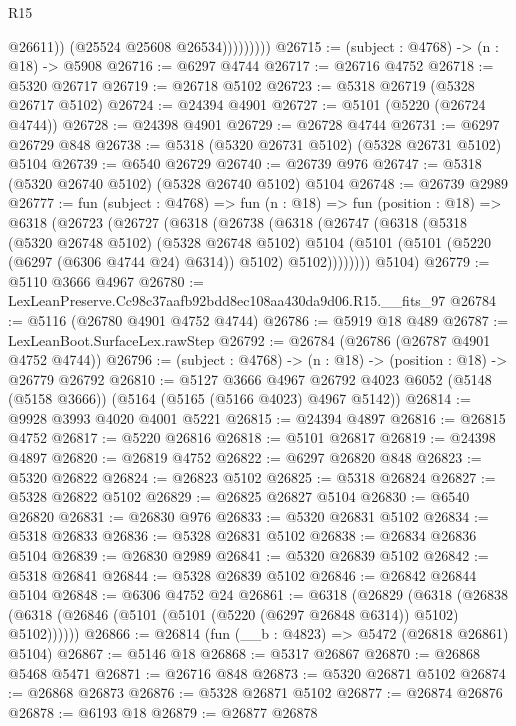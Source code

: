 \begin{lexlean}{R15}
\begin{coremodule}
{{{{{{{{{{{                        @26611))
                    (@25524 @25608 @26534)))))))))
@26715 := (subject : @4768) -> (n : @18) -> @5908
@26716 := @6297 @4744
@26717 := @26716 @4752
@26718 := @5320 @26717
@26719 := @26718 @5102
@26723 := @5318 @26719 (@5328 @26717 @5102)
@26724 := @24394 @4901
@26727 := @5101 (@5220 (@26724 @4744))
@26728 := @24398 @4901
@26729 := @26728 @4744
@26731 := @6297 @26729 @848
@26738 := @5318 (@5320 @26731 @5102) (@5328 @26731 @5102) @5104
@26739 := @6540 @26729
@26740 := @26739 @976
@26747 := @5318 (@5320 @26740 @5102) (@5328 @26740 @5102) @5104
@26748 := @26739 @2989
@26777 := fun (subject : @4768) =>
  fun (n : @18) =>
  fun (position : @18) =>
  @6318
    (@26723
      (@26727
        (@6318
          (@26738
            (@6318
              (@26747
                (@6318
                  (@5318
                    (@5320 @26748 @5102)
                    (@5328 @26748 @5102)
                    @5104
                    (@5101 (@5101 (@5220 (@6297 (@6306 @4744 @24) @6314)) @5102) @5102))))))))
      @5104)
@26779 := @5110 @3666 @4967
@26780 := LexLeanPreserve.Cc98c37aafb92bdd8ec108aa430da9d06.R15.__fits_97
@26784 := @5116 (@26780 @4901 @4752 @4744)
@26786 := @5919 @18 @489
@26787 := LexLeanBoot.SurfaceLex.rawStep
@26792 := @26784 (@26786 (@26787 @4901 @4752 @4744))
@26796 := (subject : @4768) -> (n : @18) -> (position : @18) -> @26779 @26792
@26810 := @5127
    @3666
    @4967
    @26792
    @4023
    @6052
    (@5148 (@5158 @3666))
    (@5164 (@5165 (@5166 @4023) @4967 @5142))
@26814 := @9928 @3993 @4020 @4001 @5221
@26815 := @24394 @4897
@26816 := @26815 @4752
@26817 := @5220 @26816
@26818 := @5101 @26817
@26819 := @24398 @4897
@26820 := @26819 @4752
@26822 := @6297 @26820 @848
@26823 := @5320 @26822
@26824 := @26823 @5102
@26825 := @5318 @26824
@26827 := @5328 @26822 @5102
@26829 := @26825 @26827 @5104
@26830 := @6540 @26820
@26831 := @26830 @976
@26833 := @5320 @26831 @5102
@26834 := @5318 @26833
@26836 := @5328 @26831 @5102
@26838 := @26834 @26836 @5104
@26839 := @26830 @2989
@26841 := @5320 @26839 @5102
@26842 := @5318 @26841
@26844 := @5328 @26839 @5102
@26846 := @26842 @26844 @5104
@26848 := @6306 @4752 @24
@26861 := @6318
    (@26829
      (@6318 (@26838 (@6318 (@26846 (@5101 (@5101 (@5220 (@6297 @26848 @6314)) @5102) @5102))))))
@26866 := @26814 (fun (__b : @4823) => @5472 (@26818 @26861) @5104)
@26867 := @5146 @18
@26868 := @5317 @26867
@26870 := @26868 @5468 @5471
@26871 := @26716 @848
@26873 := @5320 @26871 @5102
@26874 := @26868 @26873
@26876 := @5328 @26871 @5102
@26877 := @26874 @26876
@26878 := @6193 @18
@26879 := @26877 @26878
}}}}}}}}}}}
\end{coremodule}
\end{lexlean}
